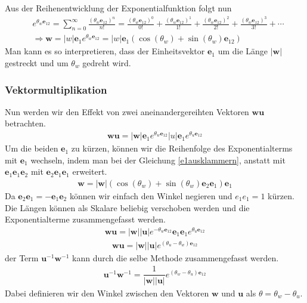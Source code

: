 Aus der Reihenentwicklung der Exponentialfunktion folgt nun
\begin{align}
	&e^{\theta_w\mathbf{e}_{12}}=\sum _{n=0}^{\infty }{\frac {(\theta_w\mathbf{e}_{12})^{n}}{n!}}={\frac {(\theta_w\mathbf{e}_{12})^{0}}{0!}}+{\frac {(\theta_w\mathbf{e}_{12})^{1}}{1!}}+{\frac {(\theta_w\mathbf{e}_{12})^{2}}{2!}}+{\frac {(\theta_w\mathbf{e}_{12})^{3}}{3!}}+\cdots\\
	&\Rightarrow \mathbf{w} = |w|\mathbf{e}_1 e^{\theta_w \mathbf{e}_{12}} = |w|\mathbf{e}_1\left(\cos(\theta_w)+ \sin(\theta_w) \mathbf{e}_{12}\right)
\end{align}
Man kann es so interpretieren, dass der Einheitsvektor $\mathbf{e}_1$ um die Länge $|\mathbf{w}|$ gestreckt und um $\theta_w$ gedreht wird.
\subsubsection{Vektormultiplikation}
Nun werden wir den Effekt von zwei aneinandergereihten Vektoren $\mathbf{wu}$ betrachten.
\begin{align}
	\mathbf{wu} = |\mathbf{w}|\mathbf{e}_1 e^{\theta_w \mathbf{e}_{12}}|u|\mathbf{e}_1 e^{\theta_u \mathbf{e}_{12}}
\end{align}
Um die beiden $\mathbf{e}_1$ zu kürzen, können wir die Reihenfolge des Exponentialterms mit $\mathbf{e}_1$ wechseln, indem man bei der Gleichung \eqref{e1ausklammern}, anstatt mit $\mathbf{e}_1\mathbf{e}_1\mathbf{e}_2$ mit $\mathbf{e}_2\mathbf{e}_1\mathbf{e}_1$ erweitert. 
\begin{align} 
	\mathbf{w} = |\mathbf{w}|\left(\cos(\theta_w)+ \sin(\theta_w) \mathbf{e}_2\mathbf{e}_1\right)\mathbf{e}_1
\end{align}
Da $\mathbf{e}_2\mathbf{e}_1 = -\mathbf{e}_1\mathbf{e}_2$ können wir einfach den Winkel negieren und $e_1e_1 = 1$ kürzen. Die Längen können als Skalare beliebig verschoben werden und die Exponentialterme zusammengefasst werden.
\begin{align}
	\mathbf{wu} = |\mathbf{w}||\mathbf{u}|e^{-\theta_w \mathbf{e}_{12}}\mathbf{e}_1\mathbf{e}_1 e^{\theta_u \mathbf{e}_{12}}
\end{align}
\begin{align}
	\mathbf{wu} = |\mathbf{w}||\mathbf{u}|e^{(\theta_u-\theta_w) \mathbf{e}_{12}}
\end{align}
der Term $\mathbf{u}^{-1}\mathbf{w}^{-1}$ kann durch die selbe Methode zusammengefasst werden. 
\begin{align}
	\mathbf{u}^{-1}\mathbf{w}^{-1} = \dfrac{1}{|\mathbf{w}||\mathbf{u}|}e^{(\theta_w-\theta_u) \mathbf{e}_{12}}
\end{align}
Dabei definieren wir den Winkel zwischen den Vektoren  $\mathbf{w}$ und $\mathbf{u}$ als $\theta = \theta_w - \theta_u$. 
